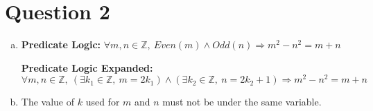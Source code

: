 \documentclass[12pt]{article}
\begin{document}
\begin{itemize}


\end{itemize}

\section*{Question 2}
\begin{enumerate}[a.]
    \item

    \textbf{Predicate Logic:} $\forall m,n \in \mathbb{Z},\:Even(m) \land Odd(n) \Rightarrow m^2 - n^2 = m + n$

    \bigskip

    \textbf{Predicate Logic Expanded:} $\forall m,n \in \mathbb{Z},\:(\exists k_1
    \in \mathbb{Z},\:m = 2k_1) \land (\exists k_2 \in \mathbb{Z},\: n = 2k_2 + 1)
    \Rightarrow m^2 - n^2 = m + n$

    \item The value of $k$ used for $m$ and $n$ must not be under the same variable.

\end{enumerate}
\end{document}
